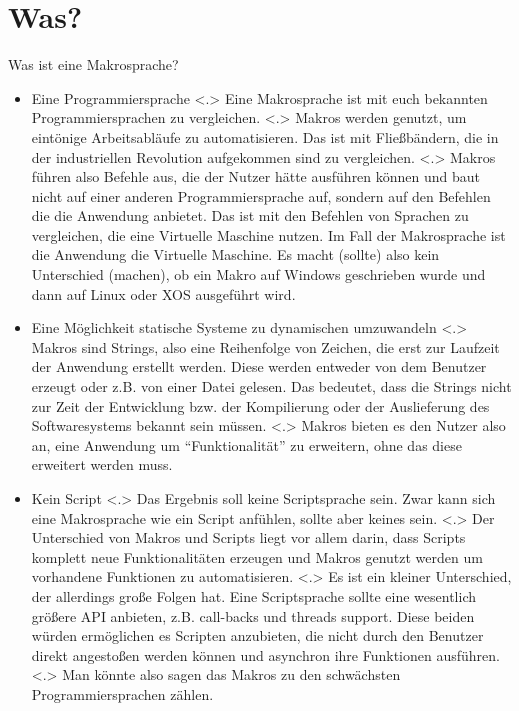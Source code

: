 \section{Was?}
  \begin{frame}{Was ist eine Makrosprache?}
    \begin{itemize}[<+- | alert@+>]
      \item
        Eine Programmiersprache
            \note[item]<.>{
              Eine Makrosprache ist mit euch bekannten Programmiersprachen zu vergleichen.
            }
            \note[item]<.>{
              Makros werden genutzt, um eintönige Arbeitsabläufe zu automatisieren. Das ist mit Fließbändern, die in der industriellen Revolution aufgekommen sind zu vergleichen.
            }
            \note[item]<.>{
              Makros führen also Befehle aus, die der Nutzer hätte ausführen können und baut nicht auf einer anderen Programmiersprache auf, sondern auf den Befehlen die die Anwendung anbietet. Das ist mit den Befehlen von Sprachen zu vergleichen, die eine Virtuelle Maschine nutzen. Im Fall der Makrosprache ist die Anwendung die Virtuelle Maschine. Es macht (sollte) also kein Unterschied (machen), ob ein Makro auf Windows geschrieben wurde und dann auf Linux oder XOS ausgeführt wird.
            }

      \item
        Eine Möglichkeit statische Systeme zu dynamischen umzuwandeln
            \note[item]<.>{
              Makros sind Strings, also eine Reihenfolge von Zeichen, die erst zur Laufzeit der Anwendung erstellt werden. Diese werden entweder von dem Benutzer erzeugt oder z.B. von einer Datei gelesen. Das bedeutet, dass die Strings nicht zur Zeit der Entwicklung bzw. der Kompilierung oder der Auslieferung des Softwaresystems bekannt sein müssen.
            }
            \note[item]<.>{
              Makros bieten es den Nutzer also an, eine Anwendung um ``Funktionalität'' zu erweitern, ohne das diese erweitert werden muss.
            }

      \item
        Kein Script
            \note[item]<.>{
              Das Ergebnis soll keine Scriptsprache sein. Zwar kann sich eine Makrosprache wie ein Script anfühlen, sollte aber keines sein.
            }
            \note[item]<.>{
              Der Unterschied von Makros und Scripts liegt vor allem darin, dass Scripts komplett neue Funktionalitäten erzeugen und Makros genutzt werden um vorhandene Funktionen zu automatisieren.
            }
            \note[item]<.>{
              Es ist ein kleiner Unterschied, der allerdings große Folgen hat. Eine Scriptsprache sollte eine wesentlich größere API anbieten, z.B. call-backs und threads support. Diese beiden würden ermöglichen es Scripten anzubieten, die nicht durch den Benutzer direkt angestoßen werden können und asynchron ihre Funktionen ausführen.
            }
            \note[item]<.>{
              Man könnte also sagen das Makros zu den schwächsten Programmiersprachen zählen.
            }
    \end{itemize}
  \end{frame}

